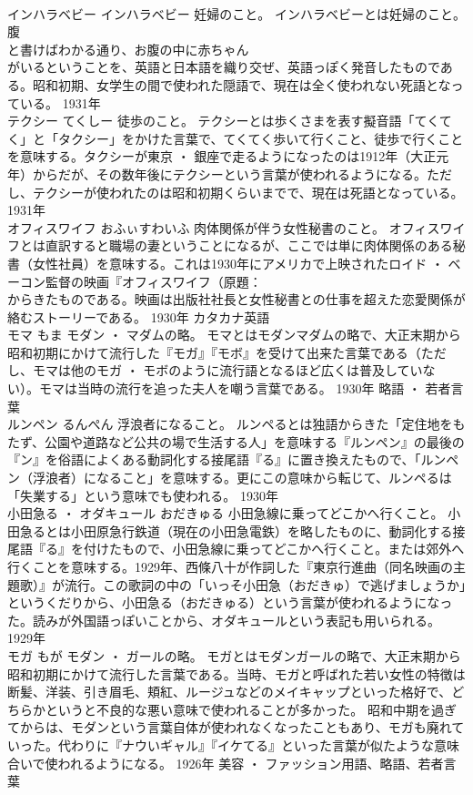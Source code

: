\documentclass[8pt]{extreport}
\begin{document}
\begin{CJK}{UTF8}{min}
\\	インハラベビー	インハラベビー	妊婦のこと。	インハラベビーとは妊婦のこと。
\\	腹 
\\	と書けばわかる通り、お腹の中に赤ちゃん
\\	がいるということを、英語と日本語を織り交ぜ、英語っぽく発音したものである。昭和初期、女学生の間で使われた隠語で、現在は全く使われない死語となっている。	1931年	
\\	テクシー	てくしー	徒歩のこと。	テクシーとは歩くさまを表す擬音語「てくてく」と「タクシー」をかけた言葉で、てくてく歩いて行くこと、徒歩で行くことを意味する。タクシーが東京 ・ 銀座で走るようになったのは1912年（大正元年）からだが、その数年後にテクシーという言葉が使われるようになる。ただし、テクシーが使われたのは昭和初期くらいまでで、現在は死語となっている。	1931年	
\\	オフィスワイフ	おふぃすわいふ	肉体関係が伴う女性秘書のこと。	オフィスワイフとは直訳すると職場の妻ということになるが、ここでは単に肉体関係のある秘書（女性社員）を意味する。これは1930年にアメリカで上映されたロイド ・ ベーコン監督の映画『オフィスワイフ（原題：
\\	からきたものである。映画は出版社社長と女性秘書との仕事を超えた恋愛関係が絡むストーリーである。	1930年	カタカナ英語	
\\	モマ	もま	モダン ・ マダムの略。	モマとはモダンマダムの略で、大正末期から昭和初期にかけて流行した『モガ』『モボ』を受けて出来た言葉である（ただし、モマは他のモガ ・ モボのように流行語となるほど広くは普及していない）。モマは当時の流行を追った夫人を嘲う言葉である。	1930年	略語 ・ 若者言葉	
\\	ルンペン	るんぺん	浮浪者になること。	ルンペるとは独語からきた「定住地をもたず、公園や道路など公共の場で生活する人」を意味する『ルンペン』の最後の『ン』を俗語によくある動詞化する接尾語『る』に置き換えたもので、「ルンペン（浮浪者）になること」を意味する。更にこの意味から転じて、ルンペるは「失業する」という意味でも使われる。	1930年	
\\	小田急る ・ オダキュール	おだきゅる	小田急線に乗ってどこかへ行くこと。	小田急るとは小田原急行鉄道（現在の小田急電鉄）を略したものに、動詞化する接尾語『る』を付けたもので、小田急線に乗ってどこかへ行くこと。または郊外へ行くことを意味する。1929年、西條八十が作詞した『東京行進曲（同名映画の主題歌）』が流行。この歌詞の中の「いっそ小田急（おだきゅ）で逃げましょうか」というくだりから、小田急る（おだきゅる）という言葉が使われるようになった。読みが外国語っぽいことから、オダキュールという表記も用いられる。	1929年	
\\	モガ	もが	モダン ・ ガールの略。	モガとはモダンガールの略で、大正末期から昭和初期にかけて流行した言葉である。当時、モガと呼ばれた若い女性の特徴は断髪、洋装、引き眉毛、頬紅、ルージュなどのメイキャップといった格好で、どちらかというと不良的な悪い意味で使われることが多かった。 昭和中期を過ぎてからは、モダンという言葉自体が使われなくなったこともあり、モガも廃れていった。代わりに『ナウいギャル』『イケてる』といった言葉が似たような意味合いで使われるようになる。	1926年	美容 ・ ファッション用語、略語、若者言葉	

\end{CJK}
\end{document}

